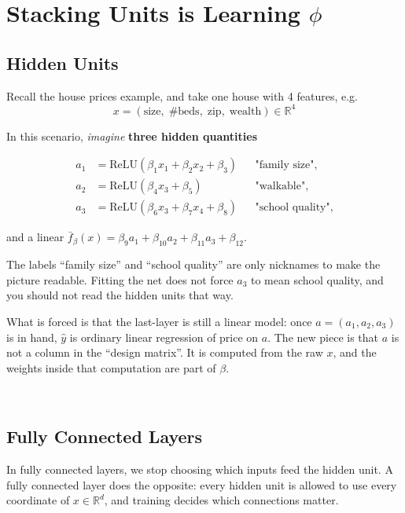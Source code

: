 \documentclass[
]{book}
\begin{document}
\section{\texorpdfstring{Stacking Units is Learning \(\phi\)}{Stacking Units is Learning \textbackslash phi}}\label{stacking-units-is-learning-phi}

\subsection{Hidden Units}\label{hidden-units}

Recall the house prices example, and take one house with 4 features, e.g.~
\[x=(\text{size},\;\#\text{beds},\;\text{zip},\;\text{wealth})\in\mathbb{R}^4\]

In this scenario, \emph{imagine} \textbf{three hidden quantities}

\[
\begin{aligned}
a_1&=\mathrm{ReLU}(\beta_1 x_1+\beta_2 x_2+\beta_3)
&&\text{"family size"},\\
a_2&=\mathrm{ReLU}(\beta_4 x_3+\beta_5)
&&\text{"walkable"},\\
a_3&=\mathrm{ReLU}(\beta_6 x_3+\beta_7 x_4+\beta_8)
&&\text{"school quality"},
\end{aligned}
\]

and a linear \(\bar f_\beta(x)=\beta_9 a_1+\beta_{10}a_2+\beta_{11}a_3+\beta_{12}\).

The labels ``family size'' and ``school quality'' are only nicknames to make the picture readable. Fitting the net does not force \(a_3\) to mean school quality, and you should not read the hidden units that way.

What is forced is that the last-layer is still a linear model: once \(a=(a_1,a_2,a_3)\) is in hand, \(\hat y\) is ordinary linear regression of price on \(a\). The new piece is that \(a\) is not a column in the ``design matrix''. It is computed from the raw \(x\), and the weights inside that computation are part of \(\beta\).

~

\subsection{Fully Connected Layers}\label{fully-connected-layers}

In fully connected layers, we stop choosing which inputs feed the hidden unit. A fully connected layer does the opposite: every hidden unit is allowed to use every coordinate of \(x\in\mathbb{R}^d\), and training decides which connections matter.
\end{document}

